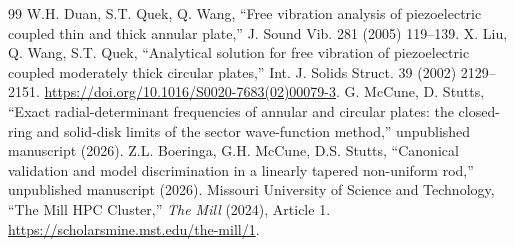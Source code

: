 \documentclass[11pt]{article}
\begin{document}
\FloatBarrier
\begin{thebibliography}{99}\small
\setlength{\itemsep}{0pt}
\setlength{\parsep}{0pt}
 W.H. Duan, S.T. Quek, Q. Wang, ``Free vibration analysis
of piezoelectric coupled thin and thick annular plate,'' J. Sound Vib. 281
(2005) 119--139.
 X. Liu, Q. Wang, S.T. Quek, ``Analytical solution for free
vibration of piezoelectric coupled moderately thick circular plates,''
Int. J. Solids Struct. 39 (2002) 2129--2151.
\url{https://doi.org/10.1016/S0020-7683(02)00079-3}.
 G. McCune, D. Stutts, ``Exact radial-determinant
frequencies of annular and circular plates: the closed-ring and solid-disk
limits of the sector wave-function method,'' unpublished manuscript (2026).
 Z.L. Boeringa, G.H. McCune, D.S. Stutts, ``Canonical
validation and model discrimination in a linearly tapered non-uniform rod,''
unpublished manuscript (2026).
 Missouri University of Science and Technology, ``The Mill
HPC Cluster,'' \emph{The Mill} (2024), Article 1.
\url{https://scholarsmine.mst.edu/the-mill/1}.
\end{thebibliography}
\end{document}
